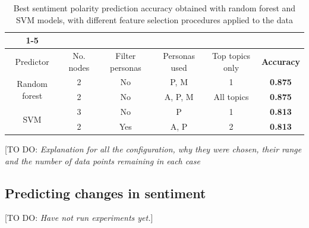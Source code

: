 \documentclass[bsc,frontabs,singlespacing,parskip]{infthesis} %
\begin{document}
\begin{table}[hbf!]
\begin{tabular}{ |c|c|c|c|c|c| }
\cline{1-5}
\multicolumn{5}{ |c| }{Configuration}\\
\hline
Predictor & No. nodes & Filter personas & Personas used & Top topics only & \textbf{Accuracy}\\ \hline
\multirow{2}{*}{Random forest} 
 & 2 & No & P, M & 1 & \textbf{0.875}\\
 & 2 & No & A, P, M & All topics & \textbf{0.875}\\ \hline
\multirow{2}{*}{SVM}
 & 3 & No & P & 1 & \textbf{0.813}\\ 
 & 2 & Yes & A, P & 2 & \textbf{0.813}\\ \hline
\end{tabular}

\caption{Best sentiment polarity prediction accuracy obtained with random forest and SVM models, with different feature selection procedures applied to the data}

\end{table}

[TO DO: \textit{Explanation for all the configuration, why they were chosen, their range and the number of data points remaining in each case}

\subsection{Predicting changes in sentiment}
[TO DO: \textit{Have not run experiments yet.}]



\end{document}
